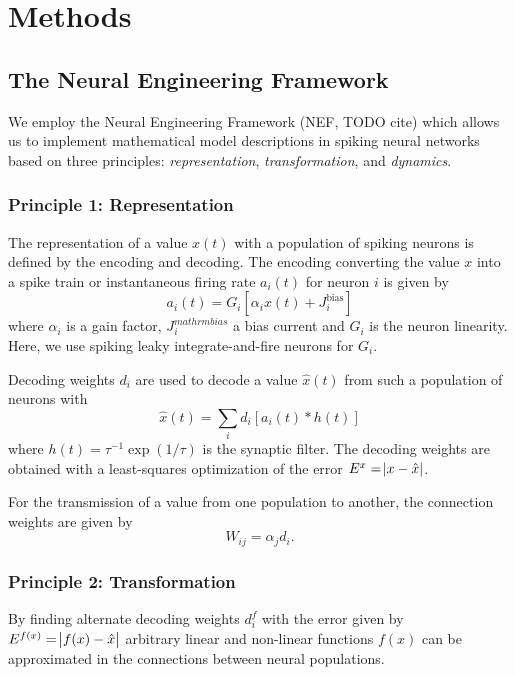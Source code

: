 \documentclass[10pt,letterpaper]{article}
\begin{document}
\section{Methods}

\subsection{The Neural Engineering Framework}
We employ the Neural Engineering Framework (NEF, TODO cite) which allows us to 
implement mathematical model descriptions in spiking neural networks based on 
three principles: \emph{representation}, \emph{transformation}, and 
\emph{dynamics}.

\subsubsection{Principle 1: Representation}
The representation of a value $x(t)$ with a population of spiking neurons is 
defined by the encoding and decoding. The encoding converting the value $x$ into 
a spike train or instantaneous firing rate $a_i(t)$ for neuron $i$ is given by
\begin{equation}
    a_i(t) = G_i\left[\alpha_i x(t) + J_i^{\mathrm{bias}}\right]
\end{equation}
where $\alpha_i$ is a gain factor, $J_i^{mathrm{bias}}$ a bias current and $G_i$ 
is the neuron linearity. Here, we use spiking leaky integrate-and-fire neurons 
for $G_i$.

Decoding weights $d_i$ are used to decode a value $\hat x(t)$ from such 
a population of neurons with
\begin{equation}
    \hat x(t) = \sum_i d_i \left[a_i(t) * h(t)\right]
\end{equation}
where $h(t) = \tau^{-1}\exp(1/\tau)$ is the synaptic filter. The decoding 
weights are obtained with a least-squares optimization of the error $E^x 
= \abs{x - \hat x}$.

For the transmission of a value from one population to another, the connection 
weights are given by
\begin{equation}
    W_{ij} = \alpha_j d_i \text{.}
\end{equation}

\subsubsection{Principle 2: Transformation}
By finding alternate decoding weights $d^f_i$ with the error given by $E^{f(x)} 
= \abs{f(x) - \hat x}$ arbitrary linear and non-linear functions $f(x)$ can be 
approximated in the connections between neural populations.
\end{document}

